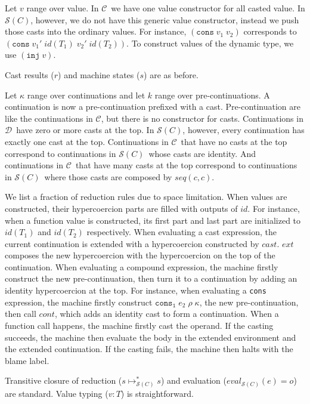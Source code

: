 \documentclass[acmsmall,review,anonymous]{acmart}\settopmatter{printfolios=true,printccs=false,printacmref=false}
\newcommand{\judgeType}[2]{#1 : #2}
\newcommand{\vOOcons}[2]{\mathtt{cons}\;#1\;#2}
\newcommand{\hcvOOinj}[2]{\mathtt{inj} \; #2}
\newcommand{\hcvOOcons}[4]{\mathtt{cons}\;#1\;#2\;#3\;#4}
\newcommand{\hckOOconsI}[3]{\mathtt{cons_1}\;#1\;#2\;#3}
\newcommand{\judgeSreduceTrans}[3]{#2 \longmapsto_{\mathcal{S}(#1)}^{*} #3}
\newcommand{\judgeSeval}[3]{eval_{\mathcal{S}(#1)}(#2) = #3}
\newcommand{\ineffCEK}{$ \mathcal{C} $}
\newcommand{\ineffCEKD}{$ \mathcal{D} $}
\newcommand{\effCEK}[1]{$ \mathcal{S}(#1) $}
\begin{document}
Let $ v $ range over value. 
In \ineffCEK\, we have one value constructor for all casted value.
In \effCEK{C}, however, we do not have this generic value constructor, 
instead we push those casts into the ordinary values. For instance, $ 
(\vOOcons{v_1}{v_2}) $ corresponds to $ 
(\hcvOOcons{v_1'}{id(T_1)}{v_2'}{id(T_2)}) $. To construct values of the 
dynamic type, we use $ (\hcvOOinj{P}{v}) $.

Cast results ($ r $) and machine states ($ s $) are as before. 

Let $ \kappa $ range over continuations and let $ k $ range over 
pre-continuations. 
A continuation is now a pre-continuation prefixed with a cast.
Pre-continuation are like the continuations in \ineffCEK, but there is no 
constructor for casts.
Continuations in \ineffCEKD\ have zero or more casts at the top.
In \effCEK{C}, however, every continuation has exactly one cast at the top.
Continuations in \ineffCEK\ that have no casts at the top correspond to 
continuations in \effCEK{C}\ whose casts are identity.
And continuations in \ineffCEK\ that have many casts at the top correspond to 
continuations in \effCEK{C}\ where those casts are composed by $ 
seq(c,c) $.

We list a fraction of reduction rules due to space limitation.
When values are constructed, their hypercoercion parts are filled with outputs 
of $ id $. For instance, when a function value is constructed, its first part 
and last part are initialized to $ id(T_1) $ and $ id(T_2) $ respectively.
When evaluating a cast expression, the current continuation is extended with a 
hypercoercion constructed by $ cast $. $ ext $ composes the new hypercoercion 
with the hypercoercion on the top of the continuation.
When evaluating a compound expression, the machine firstly construct the new 
pre-continuation, then turn it to a continuation by adding an identity 
hypercoercion at the top. For instance, when evaluating a \texttt{cons} 
expression, the machine firstly construct $ \hckOOconsI{e_2}{\rho}{\kappa} $, 
the new pre-continuation, then call $ cont $, which adds an identity cast to 
form a continuation. 
When a function call happens, the machine firstly cast the operand. If the 
casting succeeds, the machine then evaluate the body in the extended 
environment and the extended continuation. If the casting fails, the machine 
then halts with the blame label.

Transitive closure of reduction ($ \judgeSreduceTrans{C}{s}{s} $) and 
evaluation ($ \judgeSeval{C}{e}{o} $) are standard. Value typing ($ 
\judgeType{v}{T} $) is straightforward.
\end{document}
